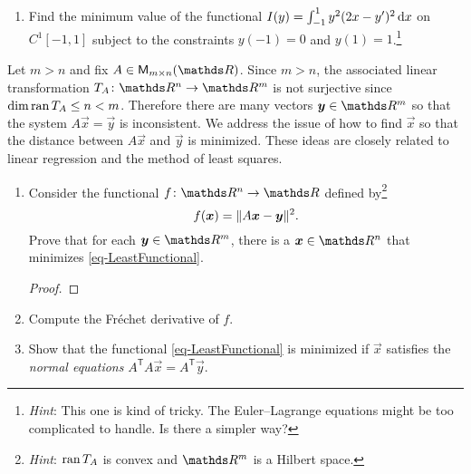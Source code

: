\documentclass{../homework}
\begin{document}
\begin{Exercise}
\begin{enumerate}
  \item Find the minimum value of the functional
    \(I(y) = \int_{-1}^1 y^2 (2x - y')^2 \mathop{}\! \mathrm d x\) on \(C^1[-1,1]\)
    subject to the constraints \(y(-1) = 0\) and
    \(y(1) = 1\).\footnote{\emph{Hint}: This one is kind of tricky.
      The Euler--Lagrange equations might be too complicated to
      handle.  Is there a simpler way?}

    \begin{solution}

    \end{solution}
	\end{enumerate}
\end{Exercise}

\begin{Exercise}
	Let \(m > n\) and fix \(A \in \M_{m \times n}(\R)\).  Since
  \(m > n\), the associated linear transformation
  \(T_A\colon\R^n \to \R^m\) is not surjective since
  \(\dim\operatorname*{ran} T_A \leq n < m\). Therefore there are many vectors
  \(\vec{y} \in \R^m\) so that the system \(A \vec{x} = \vec{y}\) is
  inconsistent.  We address the issue of how to find \(\vec{x}\) so
  that the distance between \(A\vec{x}\) and \(\vec{y}\) is minimized.
  These ideas are closely related to linear regression and the method
  of least squares.
	\begin{enumerate}
  \item Consider the functional \(f\colon\R^n \to \R\) defined
    by\footnote{\emph{Hint}: \(\operatorname*{ran} T_A\) is convex and \(\R^m\) is a
      Hilbert space.}
    \begin{equation}\label{eq-LeastFunctional}
      f( \vec{x} ) = \norm{ A \vec{x} - \vec{y}}^2.
    \end{equation}
    Prove that for each \(\vec{y} \in \R^m\), there is a
    \(\vec{x} \in \R^n\) that minimizes \eqref{eq-LeastFunctional}.

    \begin{solution}
      \begin{proof}

      \end{proof}
    \end{solution}

  \item Compute the Fr\'echet derivative of \(f\).

    \begin{solution}

    \end{solution}

  \item Show that the functional \eqref{eq-LeastFunctional} is
    minimized if \(\vec{x}\) satisfies the \emph{normal equations}
    \(A^{\mathsf{T}} A \vec{x} = A^{\mathsf{T}} \vec{y}\).


\end{enumerate}
\end{Exercise}
\end{document}
